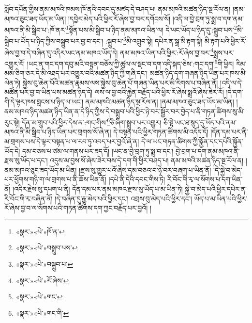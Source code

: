 སློབ་དཔོན་གྱིས་ནམ་མཁའི་ཁམས་ཁོ་ནའི་དབང་དུ་མཛད་དེ་བཤད་པ། ནམ་མཁའི་མཚན་ཉིད་སྔ་རོལ་ན། །ནམ་མཁའ་ཅུང་ཟད་ཡོད་མ་ཡིན། །དབྱེར་མེད་པའི་ཕྱིར་རོ་ཞེས་བྱ་བར་དགོངས་སོ། །འདི་ལ་བྱེ་བྲག་ཏུ་སྨྲ་བ་དག་ནམ་མཁའ་ནི་མི་སྒྲིབ་པ་:ཁོ་ནར་\footnote{«སྣར་»«པེ་»ཁོ་ན་}སྟོན་པས་མི་སྒྲིབ་པ་ཉིད་ནམ་མཁའ་ཡིན་ལ། དེ་ཡང་ཡོད་པ་ཉིད་དུ་:སྒྲུབ་པས་\footnote{«སྣར་»«པེ་»བསྒྲུབ་པས་}མི་སྒྲིབ་པ་ཡོད་པ་ཉིད་ཀྱིས་བསྒྲུབ་པར་བྱ་བ་དང་། :སྒྲུབ་པ་\footnote{«སྣར་»«པེ་»བསྒྲུབ་པ་}མི་འགྲུབ་སྟེ། དཔེར་ན་སྒྲ་མི་རྟག་སྟེ། མི་རྟག་པའི་ཕྱིར་རོ་ཞེས་བྱ་བ་དེ་བཞིན་དུ་འདིར་ཡང་ནམ་མཁའ་ཡོད་དེ། ནམ་མཁའ་ཡིན་པའི་ཕྱིར་:རོ་ཞེས་བྱ་བར་\footnote{«སྣར་»«པེ་»རོ་ཞེས་}སྨྲས་པར་འགྱུར་རོ། །ཡང་ན་གང་དག་དབུ་མའི་བསྟན་བཅོས་ཀྱི་ཚུལ་ལ་སྡང་བ་དག་འདི་སྐད་ཅེས་:གང་དག་\footnote{«སྣར་»«པེ་»གང་}གི་ཕྱིར། རིམ་མམ་ཅིག་ཅར་དེ་མི་འཐད་པར་འགྱུར་བའི་མཚན་ཉིད་ཀྱི་གཞི་དང་། མཚན་ཉིད་དག་གཞན་ཉིད་ཡིན་པར་ཁས་མི་ལེན་ཏེ། སྐྱེས་བུ་ཆེན་པོའི་མཚན་རྣམས་ལས་སྐྱེས་བུ་ཆེན་པོ་གཞན་ཡིན་པར་མི་རིགས་པ་བཞིན་ནོ། །འདི་ལ་དེ་མཚོན་པར་བྱ་བ་ཡིན་པས་མཚན་ཉིད་དེ། ལས་ལ་བྱ་བའི་རྐྱེན་བརྗོད་པའི་ཕྱིར་རོ་ཞེས་སྨྲའོ་ཞེས་ཟེར་རོ། །དེ་དག་གི་དེ་ལྟར་ཁས་བླངས་པ་ཉིད་ལ་ཡང་། ནམ་མཁའི་མཚན་ཉིད་སྔ་རོལ་ན། །ནམ་མཁའ་ཅུང་ཟད་ཡོད་མ་ཡིན། །ནམ་མཁའ་ཉིད་མཚན་ཉིད་ཡིན་ན་དེ་ཉིད་ཀྱིས་དེ་བསྒྲུབ་པའི་ཕྱིར་ཉེ་བར་སྦྱོར་བར་བྱེད་པ་ནི་གཏན་ཚིགས་སུ་མི་རུང་སྟེ། དོན་མ་གྲུབ་པའི་ཕྱིར་དེས་ན་:གང་གིས་\footnote{«སྣར་»«པེ་»གང་གི་}ཅི་ཞིག་སྒྲུབ་པར་འགྱུར། ཅི་སྟེ་ཡང་ཐ་སྙད་དུ་ཡོད་པའི་ནམ་མཁའ་ནི་མི་སྒྲིབ་པ་ཉིད་ཡིན་པར་གྲགས་སོ་ཞེ་ན། དེ་བསྟན་པའི་ཕྱིར་གཏན་ཚིགས་མི་འདོད་དོ། །དོན་དམ་པར་ནི་མ་གྲགས་པས་དེ་ལྟར་བསྟན་པ་ལ་རབ་ཏུ་འབད་པར་བྱའོ་ཞེ་ན། དེ་ལ་ཡང་གཏན་ཚིགས་ཀྱི་སྐྱོན་དང་དཔེའི་སྐྱོན་ཡོད་དེ། དམ་བཅས་པ་ཙམ་ལ་གནས་པར་ཟད་དོ། །ཡང་ན་བྱེ་བྲག་ཏུ་སྨྲ་བ་དང་། བྱེ་བྲག་པ་དག་ནམ་མཁའ་ནི་རྫས་སུ་ཡོད་པ་དང་། འདུས་མ་བྱས་སོ་ཞེས་ཟེར་བས་དེ་དག་གི་ཕྱིར་བཤད་པ། ནམ་མཁའི་མཚན་ཉིད་སྔ་རོལ་ན། །ནམ་མཁའ་ཅུང་ཟད་ཡོད་མ་ཡིན། །རྫས་སུ་གྱུར་པའོ་ཞེས་དམ་བཅའ་བ་ཉེ་བར་བཞག་པ་ཡིན་ནོ། །དེ་སྐྱེ་བ་མེད་པར་ཕྱོགས་གཉི་ག་ལ་གྲགས་པ་ནི་ཆོས་ཡིན་ནོ། །དཔེ་ནི་དེའི་དབང་གིས་ཏེ། རི་བོང་གི་རྭ་ལ་སོགས་པ་དག་ཡིན་ནོ། །འདིར་རྗེས་སུ་དཔག་པ་ནི། དོན་དམ་པར་ནམ་མཁའ་རྫས་སུ་ཡོད་པ་མ་ཡིན་ཏེ། སྐྱེ་བ་མེད་པའི་ཕྱིར་དཔེར་ན་རི་བོང་གི་རྭ་བཞིན་ནོ། །དེ་བཞིན་དུ་རྒྱུ་མེད་པའི་ཕྱིར་དང་། འབྲས་བུ་མེད་པའི་ཕྱིར་དང་། ཡོད་པ་མ་ཡིན་པའི་ཕྱིར་རོ་ཞེས་བྱ་བ་ལ་སོགས་པའི་གཏན་ཚིགས་དག་ཀྱང་བརྗོད་པར་བྱའོ། །
